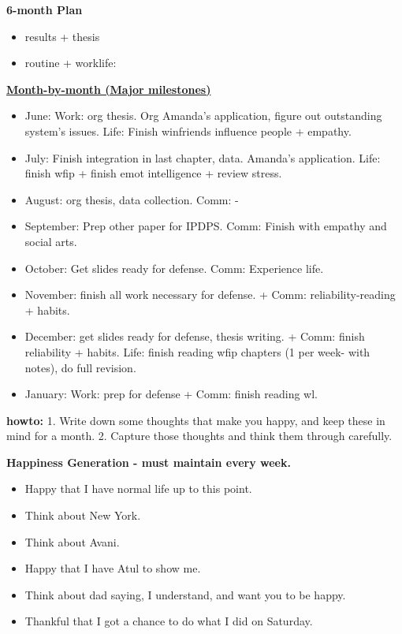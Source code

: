 \documentclass[11pt]{article}
\begin{document}
\textbf{6-month Plan} 
\begin{itemize} 
  \tiny \item \tiny results + thesis
\item \tiny routine + worklife:
\end{itemize}
\newpage
    {\small \underline{\textbf{Month-by-month (Major milestones)}}}\\ 
    \begin{itemize}
      \small \item \small June: Work: org thesis. Org Amanda's
      application, figure out outstanding system's issues. Life:
      Finish winfriends influence people + empathy. 
    \item \small July: Finish integration in last chapter,
      data. Amanda's application. Life: finish wfip + finish emot
      intelligence + review stress. 
    \item \small August: org thesis, data collection. Comm:  - 
    \item \small September: Prep other paper for IPDPS. Comm: Finish
      with empathy and social arts. 
    \item \small October: Get slides ready for defense. Comm: Experience life. 
    \item \small November: finish all work necessary for defense.  +
      Comm: reliability-reading + habits. 
    \item \small December: get slides ready for defense, thesis
      writing.  + Comm: finish reliability + habits.  Life:
      finish reading wfip chapters (1 per week- with notes), 
      do full revision. 
    \item \small January: Work: prep for defense  +  Comm: finish reading wl. 
    \end{itemize} 

\newpage 
\textbf{howto:} 1. Write down some thoughts that make you happy, and
keep these in mind for a month.  2. Capture those thoughts and think
them through carefully. 

\textbf{Happiness Generation - must maintain every week.}
\begin{itemize}
  \tiny \item \tiny Happy that I have normal life up to this point.
  \item \tiny Think about New York. 
  \item \tiny Think about Avani. 
  \item \tiny Happy that I have Atul to show me.
  \item \tiny Think about dad saying, I understand, and want you to be happy. 
  \item \tiny Thankful that I got a chance to do what I did on Saturday. 
\end{itemize} 
\end{document}
